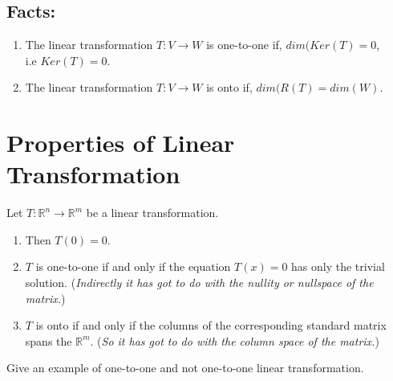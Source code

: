 \documentclass[aima104_lecturenotes_ku.tex]{subfiles}
\begin{document}
\subsection{Facts:}
\begin{enumerate}
\item The linear transformation $T: V \to W$ is one-to-one if, $dim(Ker(T) = 0$, \\
  i.e $Ker(T) = {0}$.

\item The linear transformation $T: V \to W$ is onto if, $dim(R(T) = dim(W)$.
\end{enumerate}

\section{Properties of Linear Transformation}
Let $T: \mathbb{R}^n \to \mathbb{R}^m$ be a linear transformation.
\begin{enumerate}
\item Then $T(0)=0$.
\item $T$ is one-to-one if and only if the equation $T(x)=0$ has only the trivial solution. (\textit{Indirectly it has got to do with the nullity or nullspace of the matrix.})
\item $T$ is onto if and only if the columns of the corresponding standard matrix spans the $\mathbb{R}^m$. (\textit{So it has got to do with the column space of the matrix.})
\end{enumerate}
Give an example of one-to-one and not one-to-one linear transformation.
\end{document}
